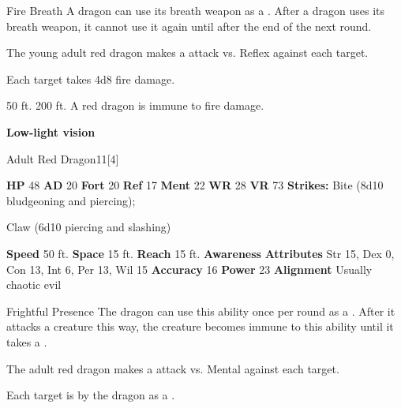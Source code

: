     \begin{freeability}{Fire Breath}
      A dragon can use its breath weapon as a .
      After a dragon uses its breath weapon, it cannot use it again until after the end of the next round.
      \par The young adult red dragon makes a  attack
        vs. Reflex against each target.
    
    \hit Each target takes 4d8 fire damage.
    \end{freeability}
  
      
       50 ft.
     200 ft.
     A red dragon is immune to fire damage.
    \par\noindent\textbf{Low-light vision}
  

  \begin{monsubsection}{Adult Red Dragon}{11}[4]
    \vspace{-1em}\vspace{-1em}
    \vspace{0em}

    
    

    \begin{spellcontent}
      \begin{spelltargetinginfo}
        \pari \textbf{HP} 48 \monsep
          \textbf{AD} 20 \monsep
          \textbf{Fort} 20 \monsep
          \textbf{Ref} 17 \monsep
          \textbf{Ment} 22
        \pari \textbf{WR} 28 \monsep
        \textbf{VR} 73
        \pari \textbf{Strikes:}
            Bite  (8d10 bludgeoning and piercing);
\par Claw  (6d10 piercing and slashing)
      \end{spelltargetinginfo}
    \end{spellcontent}
    \begin{monsterfooter}
      \pari \textbf{Speed} 50 ft. \monsep
        \textbf{Space} 15 ft. \monsep
        \textbf{Reach} 15 ft.
      \pari \textbf{Awareness} 
      \pari \textbf{Attributes}
        Str 15, Dex 0,
        Con 13, Int 6,
        Per 13, Wil 15
      \pari \textbf{Accuracy} 16 \monsep
        \textbf{Power} 23
      \pari \textbf{Alignment} Usually chaotic evil
    \end{monsterfooter}
  \end{monsubsection}
  \begin{freeability}{Frightful Presence}
      The dragon can use this ability once per round as a .
      After it attacks a creature this way, the creature becomes immune to this ability until it takes a .
      \par The adult red dragon makes a  attack
        vs. Mental against each target.
    
    \hit Each target is  by the dragon as a .
    \end{freeability}
  


